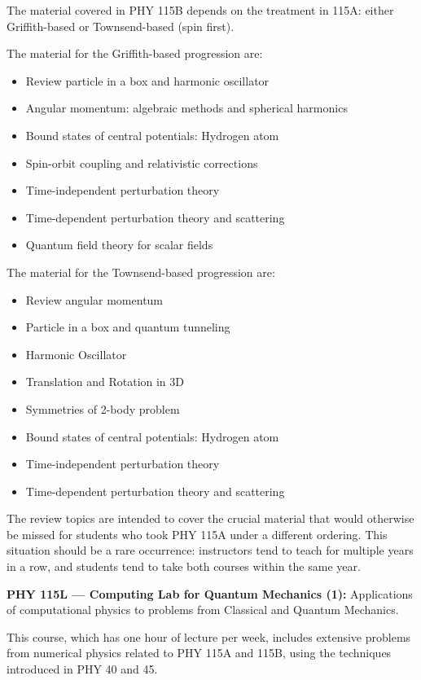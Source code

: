 \documentclass[12pt]{article}
\begin{document}
The material covered in PHY 115B depends on the treatment in 115A: either Griffith-based or Townsend-based (spin first).

The material for the Griffith-based progression are:
\begin{itemize}
\item Review particle in a box and harmonic oscillator 
\item Angular momentum: algebraic methods and spherical harmonics
\item Bound states of central potentials: Hydrogen atom
\item Spin-orbit coupling and relativistic corrections
\item Time-independent perturbation theory
\item Time-dependent perturbation theory and scattering
\item Quantum field theory for scalar fields
\end{itemize}

The material for the Townsend-based progression are:
\begin{itemize}
\item Review angular momentum 
\item Particle in a box and quantum tunneling
\item Harmonic Oscillator
\item Translation and Rotation in 3D
\item Symmetries of 2-body problem 
\item Bound states of central potentials: Hydrogen atom
\item Time-independent perturbation theory
\item Time-dependent perturbation theory and scattering
\end{itemize}

The review topics are intended to cover the crucial material that would
otherwise be missed for students who took PHY 115A under a different
ordering.  This situation should be a rare occurrence: instructors tend
to teach for multiple years in a row, and students tend to take both
courses within the same year.

\vskip 1cm
\noindent
{\bf PHY 115L --- Computing Lab for Quantum Mechanics (1):}
Applications of computational physics to problems from Classical and Quantum Mechanics.

This course, which has one hour of lecture per week, includes
extensive problems from numerical physics related to PHY 115A and 115B,
using the techniques introduced in PHY 40 and 45.
\end{document}

